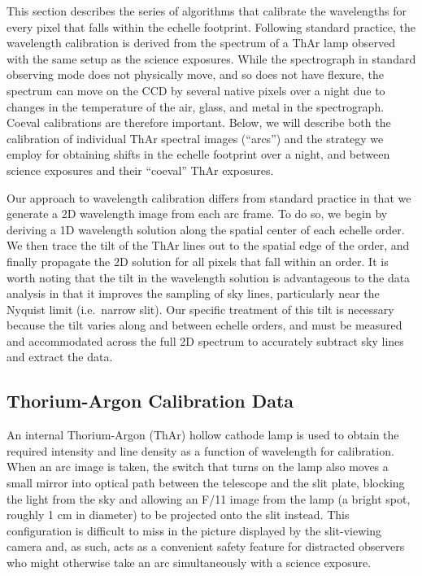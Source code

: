 \documentclass[12pt,preprint]{aastex}
\begin{document}
This section describes the series of algorithms that calibrate the
wavelengths for every pixel that falls within the
echelle footprint.  Following standard practice, the wavelength
calibration is derived from the spectrum of a ThAr lamp observed with
the same setup as the science exposures.  While the
spectrograph in standard observing mode does not physically move, and so
does not have flexure, the spectrum can move on the CCD by several
native pixels over a night due to changes in the temperature of the
air, glass, and metal in the spectrograph.  Coeval calibrations are
therefore important.  Below, we will describe both the calibration of
individual ThAr spectral images (``arcs'') and the strategy we employ for obtaining
shifts in the echelle footprint over a night, and between 
science exposures and their ``coeval'' ThAr exposures.

Our approach to wavelength calibration differs from standard practice
in that we generate a 2D wavelength image from each arc frame.  To do
so, we begin by deriving a 1D wavelength solution along the spatial
center of each echelle order.  We then trace the tilt of the ThAr lines
out to the spatial edge of the order, and finally propagate the 2D
solution for all pixels that fall within an order.  It is worth noting
that the tilt in the wavelength solution is advantageous to the data
analysis in that it improves the sampling of sky lines, particularly
near the Nyquist limit (i.e.\ narrow slit).  Our specific treatment
of this tilt is necessary because the tilt varies along and between
echelle orders, and must be measured and accommodated across the full 2D
spectrum to accurately subtract  sky lines and 
extract the data.

\subsection{Thorium-Argon Calibration Data}

An internal Thorium-Argon (ThAr) hollow cathode lamp is used to 
obtain the required intensity and
line density as a function of wavelength for calibration. When an arc
image is taken, the switch that turns on the lamp also moves a small
mirror into optical path between the telescope and the slit plate,
blocking the light from the sky and allowing an F/11 image from the
lamp (a bright spot, roughly 1 cm in diameter) to be projected onto the
slit instead. This configuration is difficult to miss in the picture
displayed by the slit-viewing camera and, as such, acts 
as a convenient safety feature for
distracted observers who might otherwise take an arc simultaneously
with a science exposure.
\end{document}

